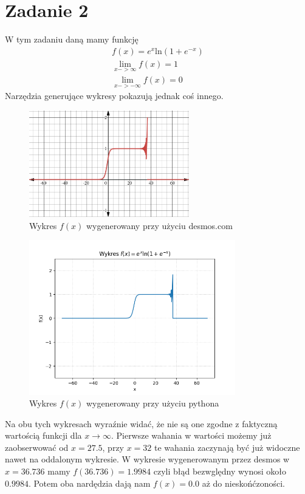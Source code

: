 \documentclass{article}
\begin{document}
\section*{Zadanie 2}
W tym zadaniu daną mamy funkcję
\begin{gather*}
  f(x) = e^x\text{ln}(1+e^{-x}) \\
  \lim_{x->\infty}f(x) = 1 \\ 
  \lim_{x->-\infty}f(x) = 0
\end{gather*}
Narzędzia generujące wykresy pokazują jednak coś innego.
\begin{figure}[H]
  \centering
  \includegraphics[width=0.62\textwidth]{../images/desmos-graph.png}
  \caption{Wykres $f(x)$ wygenerowany przy użyciu desmos.com}
\end{figure}
\begin{figure}[H]
  \centering
  \includegraphics[width=0.8\textwidth]{../images/my-graph.png}
  \caption{Wykres $f(x)$ wygenerowany przy użyciu pythona}
\end{figure}
Na obu tych wykresach wyraźnie widać, że nie są one zgodne
z faktyczną wartością funkcji dla $x\to\infty$. Pierwsze
wahania w wartości możemy już zaobserwować od $x=27.5$,
przy $x=32$ te wahania zaczynają być już widoczne nawet
na oddalonym wykresie. W wykresie wygenerowanym przez desmos
w $x=36.736$ mamy $f(36.736) = 1.9984$ czyli błąd bezwględny
wynosi około $0.9984$. Potem oba nardędzia dają nam $f(x) = 0.0$
aż do nieskońćzoności.
\end{document}
